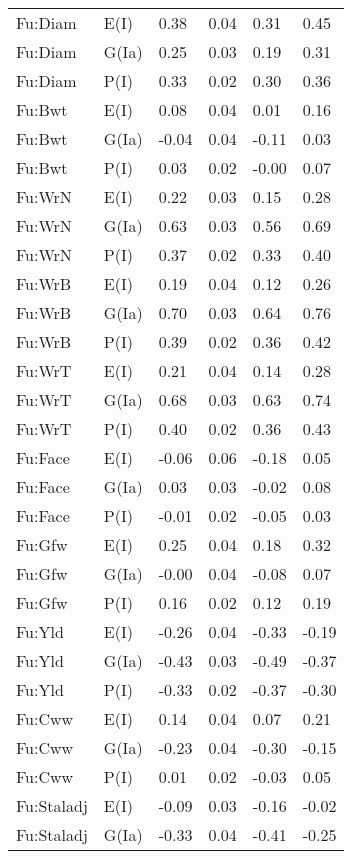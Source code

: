 \begin{center}
\begin{longtable}{|p{1.1in}|p{0.7in}|p{0.7in}|p{0.6in}|p{0.6in}|p{0.6in}|}
  Fu:Diam & E(I) & 0.38 & 0.04 & 0.31 & 0.45 \\ 
  Fu:Diam & G(Ia) & 0.25 & 0.03 & 0.19 & 0.31 \\ 
  Fu:Diam & P(I) & 0.33 & 0.02 & 0.30 & 0.36 \\ 
  Fu:Bwt & E(I) & 0.08 & 0.04 & 0.01 & 0.16 \\ 
  Fu:Bwt & G(Ia) & -0.04 & 0.04 & -0.11 & 0.03 \\ 
  Fu:Bwt & P(I) & 0.03 & 0.02 & -0.00 & 0.07 \\ 
  Fu:WrN & E(I) & 0.22 & 0.03 & 0.15 & 0.28 \\ 
  Fu:WrN & G(Ia) & 0.63 & 0.03 & 0.56 & 0.69 \\ 
  Fu:WrN & P(I) & 0.37 & 0.02 & 0.33 & 0.40 \\ 
  Fu:WrB & E(I) & 0.19 & 0.04 & 0.12 & 0.26 \\ 
  Fu:WrB & G(Ia) & 0.70 & 0.03 & 0.64 & 0.76 \\ 
  Fu:WrB & P(I) & 0.39 & 0.02 & 0.36 & 0.42 \\ 
  Fu:WrT & E(I) & 0.21 & 0.04 & 0.14 & 0.28 \\ 
  Fu:WrT & G(Ia) & 0.68 & 0.03 & 0.63 & 0.74 \\ 
  Fu:WrT & P(I) & 0.40 & 0.02 & 0.36 & 0.43 \\ 
  Fu:Face & E(I) & -0.06 & 0.06 & -0.18 & 0.05 \\ 
  Fu:Face & G(Ia) & 0.03 & 0.03 & -0.02 & 0.08 \\ 
  Fu:Face & P(I) & -0.01 & 0.02 & -0.05 & 0.03 \\ 
  Fu:Gfw & E(I) & 0.25 & 0.04 & 0.18 & 0.32 \\ 
  Fu:Gfw & G(Ia) & -0.00 & 0.04 & -0.08 & 0.07 \\ 
  Fu:Gfw & P(I) & 0.16 & 0.02 & 0.12 & 0.19 \\ 
  Fu:Yld & E(I) & -0.26 & 0.04 & -0.33 & -0.19 \\ 
  Fu:Yld & G(Ia) & -0.43 & 0.03 & -0.49 & -0.37 \\ 
  Fu:Yld & P(I) & -0.33 & 0.02 & -0.37 & -0.30 \\ 
  Fu:Cww & E(I) & 0.14 & 0.04 & 0.07 & 0.21 \\ 
  Fu:Cww & G(Ia) & -0.23 & 0.04 & -0.30 & -0.15 \\ 
  Fu:Cww & P(I) & 0.01 & 0.02 & -0.03 & 0.05 \\ 
  Fu:Staladj & E(I) & -0.09 & 0.03 & -0.16 & -0.02 \\ 
  Fu:Staladj & G(Ia) & -0.33 & 0.04 & -0.41 & -0.25 \\ 

\end{longtable}
\end{center}
